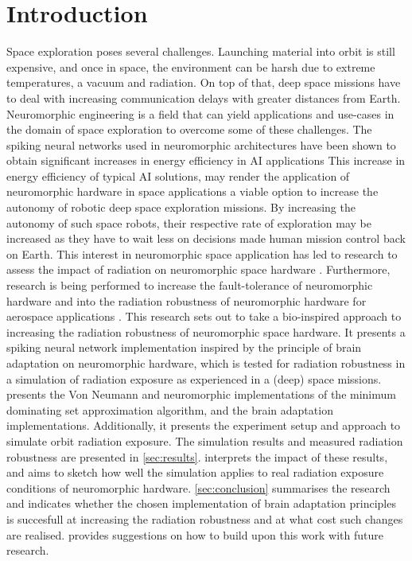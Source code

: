 \section{Introduction}\label{sec:introduction}
Space exploration poses several challenges. Launching material into orbit is still expensive, and once in space, the environment can be harsh due to extreme temperatures, a vacuum and radiation. On top of that, deep space missions have to deal with increasing communication delays with greater distances from Earth. Neuromorphic engineering is a field that can yield applications and use-cases in the domain of space exploration to overcome some of these challenges. The spiking neural networks used in neuromorphic architectures have been shown to obtain significant increases in energy efficiency in AI applications \cite{}\cite{}%
This increase in energy efficiency of typical AI solutions, may render the application of neuromorphic hardware in space applications a viable option to increase the autonomy of robotic deep space exploration missions. By increasing the autonomy of such space robots, their respective rate of exploration may be increased as they have to wait less on decisions made human mission control back on Earth. This interest in neuromorphic space application has led to research to assess the impact of radiation on neuromorphic space hardware \cite{cantley_impact_2021,roffe_neutron-induced_2021}. Furthermore, research is being performed to increase the fault-tolerance of neuromorphic hardware \cite{tran_design_2011} and into the radiation robustness of neuromorphic hardware for aerospace applications \cite{vaz_cmos_2020}. This research sets out to take a bio-inspired approach to increasing the radiation robustness of neuromorphic space hardware. It presents a spiking neural network implementation inspired by the principle of brain adaptation on neuromorphic hardware, which is tested for radiation robustness in a simulation of radiation exposure as experienced in a (deep) space missions.  presents the Von Neumann and neuromorphic implementations of the minimum dominating set approximation algorithm, and the brain adaptation implementations. Additionally, it presents the experiment setup and approach to simulate orbit radiation exposure. The simulation results and measured radiation robustness are presented in \cref{sec:results}.  interprets the impact of these results, and aims to sketch how well the simulation applies to real radiation exposure conditions of neuromorphic hardware. \cref{sec:conclusion} summarises the research and indicates whether the chosen implementation of brain adaptation principles is succesfull at increasing the radiation robustness and at what cost such changes are realised. provides suggestions on how to build upon this work with future research.